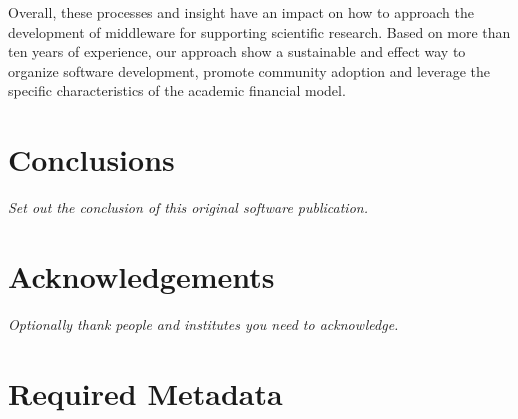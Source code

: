 \documentclass[preprint,12pt, a4paper]{elsarticle}
\begin{document}
Overall, these processes and insight have an impact on how to approach the
development of middleware for supporting scientific research. Based on more
than ten years of experience, our approach show a sustainable and effect way
to organize software development, promote community adoption and leverage the
specific characteristics of the academic financial model.

\section{Conclusions}\label{sec:conclusions}

{\em Set out the conclusion of this original software publication.}


\section*{Acknowledgements}

{\em Optionally thank people and institutes you need to acknowledge. }




 



\section*{Required Metadata}\label{sec:metadata}


\end{document}
